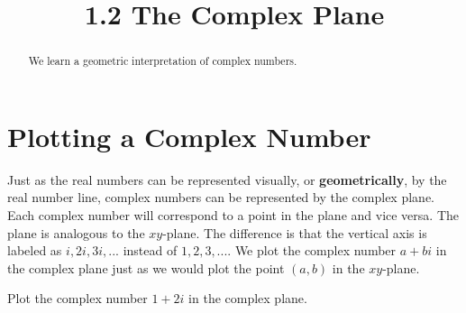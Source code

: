 \documentclass[handout]{ximera}
\title{1.2 The Complex Plane}
\begin{document}
\begin{abstract}
We learn a geometric interpretation of complex numbers.
\end{abstract}

\maketitle

\section{Plotting a Complex Number}

Just as the real numbers can be represented visually, or {\bf geometrically}, by the real number line, 
complex numbers can be represented by the complex plane.  
Each complex number will correspond to a point in the plane and vice versa. The plane is analogous to the $xy$-plane.  
The difference is that the vertical axis is labeled as $i, 2i, 3i, ...$ instead of $1, 2, 3, ...$.
We plot the complex number $a+bi$ in the complex plane just as we would plot the point $(a,b)$ in the $xy$-plane.


\begin{example}[Example 1]
Plot the complex number $1+2i$ in the complex plane.

\begin{image}
\end{image}


\end{example}
\end{document}
